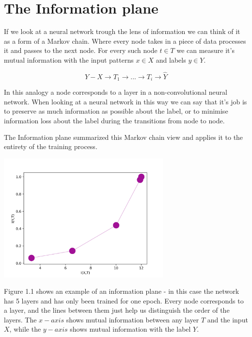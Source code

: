 \section{The Information plane}

If we look at a neural network trough the lens of information we can think of it
as a form of a Markov chain. Where every node takes in a piece of data processes
it and passes to the next node. For every such node $ t \in T $ we can measure
it's mutual information with the input patterns $ x \in X $ and labels $ y \in Y
$. 

$$ Y - X \rightarrow T_1 \rightarrow ... \rightarrow T_i \rightarrow \hat{Y} $$

In this analogy a node corresponds to a layer in a non-convolutional neural
network. When looking at a neural network in this way we can say that it's job
is to preserve as much information as possible about the label, or to minimise
information loss about the label during the transitions from node to node.

The Information plane summarized this Markov chain view and applies it to the
entirety of the training process.

\begin{center}
  \includegraphics[width=0.65\textwidth]{figs/ip_1v2.png}
\end{center}

Figure 1.1 shows an example of an information plane - in this case the network
has 5 layers and has only been trained for one epoch. Every node corresponds to
a layer, and the lines between them just help us distinguish the order of the
layers. The $ x-axis $ shows mutual information between any layer $ T $ and the
input $ X $, while the $ y-axis $ shows mutual information with the label $ Y $.

